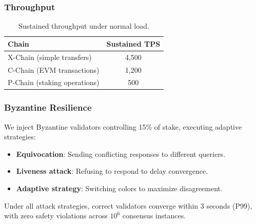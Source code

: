 \subsubsection{Throughput}

\begin{table}[h]
\centering
\begin{tabular}{@{}lc@{}}
\toprule
\textbf{Chain} & \textbf{Sustained TPS} \\
\midrule
X-Chain (simple transfers) & 4,500 \\
C-Chain (EVM transactions) & 1,200 \\
P-Chain (staking operations) & 500 \\
\bottomrule
\end{tabular}
\caption{Sustained throughput under normal load.}
\end{table}

\subsubsection{Byzantine Resilience}

We inject Byzantine validators controlling 15\% of stake, executing adaptive strategies:
\begin{itemize}
    \item \textbf{Equivocation}: Sending conflicting responses to different queriers.
    \item \textbf{Liveness attack}: Refusing to respond to delay convergence.
    \item \textbf{Adaptive strategy}: Switching colors to maximize disagreement.
\end{itemize}

Under all attack strategies, correct validators converge within 3 seconds (P99), with zero safety violations across $10^6$ consensus instances.
